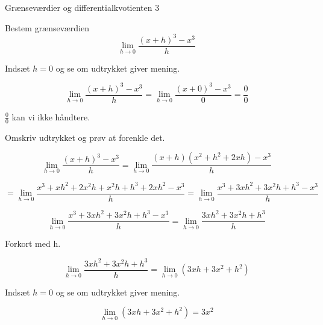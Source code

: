 \documentclass{article}
\begin{document}
\newpage
\begin{exercise}{Grænseværdier og differentialkvotienten 3}

Bestem grænseværdien
\[
\lim_{h \to 0} \frac{(x + h)^3 - x^3}{h}
\]


\hint
Indsæt $h=0$ og se om udtrykket giver mening.

\hint
\[
\lim_{h \to 0} \frac{(x + h)^3 - x^3}{h} = \lim_{h \to 0} \frac{(x + 0)^3 - x^3}{0} = \frac{0}{0}
\]

\hint
$\frac{0}{0}$ kan vi ikke håndtere.

\hint
Omskriv udtrykket og prøv at forenkle det.

\hint
\[
\lim_{h \to 0} \frac{(x + h)^3 - x^3}{h} = \lim_{h \to 0} \frac{(x + h)(x^2 + h^2 + 2xh)-x^3}{h}
\]

\hint
\[
= \lim_{h \to 0} \frac{x^3 + xh^2 + 2x^2h + x^2h + h^3 + 2xh^2 - x^3}{h} = \lim_{h \to 0} \frac{x^3 + 3xh^2 + 3x^2h + h^3 - x^3}{h}
\]


\hint
\[
 \lim_{h \to 0} \frac{x^3 + 3xh^2 + 3x^2h + h^3 - x^3}{h} = \lim_{h \to 0} \frac{3xh^2 + 3x^2h + h^3}{h}
\]

\hint
Forkort med h.

\hint
\[
\lim_{h \to 0} \frac{3xh^2 + 3x^2h + h^3}{h} = \lim_{h \to 0} \left(3xh + 3x^2 + h^2\right)
\]

\hint
Indsæt $h=0$ og se om udtrykket giver mening.

\hint
\[
\lim_{h \to 0} \left(3xh + 3x^2 + h^2\right) = 3x^2
\]

\end{exercise}
\end{document}
